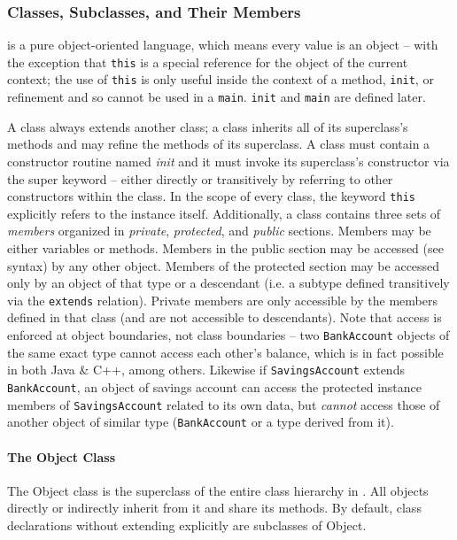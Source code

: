 \subsubsection{Classes, Subclasses, and Their Members}
\Lang{} is a pure object-oriented language, which means every value is an object -- with the exception that \verb!this! is a special reference for the object of the current context; the use of \verb!this! is only useful inside the context of a method, \verb!init!, or refinement and so cannot be used in a \verb!main!. \verb!init! and \verb!main! are defined later.

A class always extends another class; a class inherits all of its superclass's methods and may refine the methods of its superclass. A class must contain a constructor routine named \textit{init} and it must invoke its superclass's constructor via the super keyword -- either directly or transitively by referring to other constructors within the class. In the scope of every class, the keyword \verb!this! explicitly refers to the instance itself. Additionally, a class contains three sets of \textit{members} organized in \textit{private}, \textit{protected}, and \textit{public} sections. Members may be either variables or methods. Members in the public section may be accessed (see syntax) by any other object. Members of the protected section may be accessed only by an object of that type or a descendant (i.e. a subtype defined transitively via the \verb!extends! relation). Private members are only accessible by the members defined in that class (and are not accessible to descendants). Note that access is enforced at object boundaries, not class boundaries -- two \verb!BankAccount! objects of the same exact type cannot access each other's balance, which is in fact possible in both Java \& C++, among others. Likewise if \verb!SavingsAccount! extends \verb!BankAccount!, an object of savings account can access the protected instance members of \verb!SavingsAccount! related to its own data, but \emph{cannot} access those of another object of similar type (\verb!BankAccount! or a type derived from it).

\paragraph{The Object Class}
The Object class is the superclass of the entire class hierarchy in \Lang{}. All objects directly or indirectly inherit from it and share its methods. By default, class declarations without extending explicitly are subclasses of Object.

